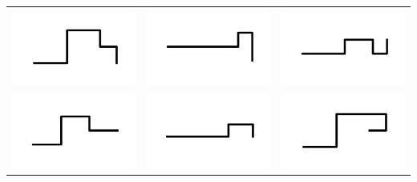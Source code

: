  {
  \begin{tabular}{ c c c }
    \includegraphics[width=.252\linewidth]{supplement/beta_cluster_example_2/pictures/17/state_cluster_shapes_0.pdf} &
    \includegraphics[width=.252\linewidth]{supplement/beta_cluster_example_2/pictures/17/state_cluster_shapes_1.pdf} & 
    \includegraphics[width=.252\linewidth]{supplement/beta_cluster_example_2/pictures/17/state_cluster_shapes_2.pdf} \\
    \includegraphics[width=.252\linewidth]{supplement/beta_cluster_example_2/pictures/17/state_cluster_shapes_3.pdf} &
    \includegraphics[width=.252\linewidth]{supplement/beta_cluster_example_2/pictures/17/state_cluster_shapes_4.pdf} &
    \includegraphics[width=.252\linewidth]{supplement/beta_cluster_example_2/pictures/17/state_cluster_shapes_5.pdf} 
  \end{tabular}
}
%
